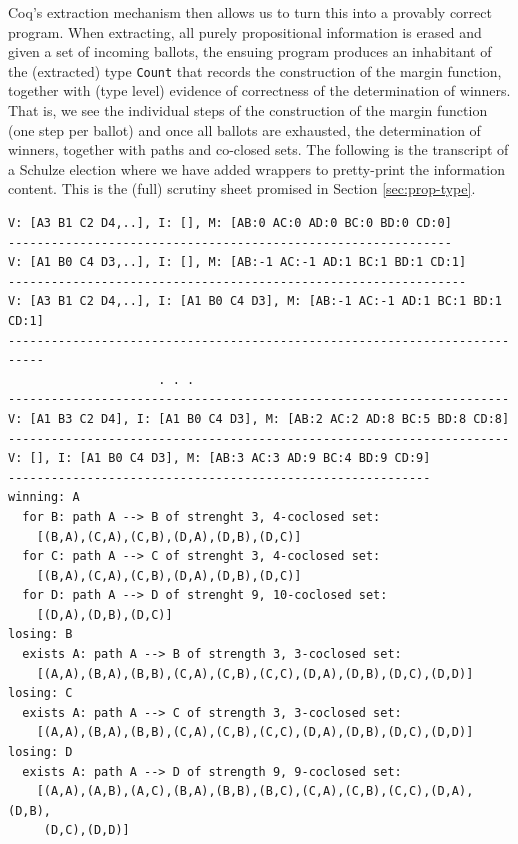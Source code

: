 Coq's extraction mechanism then allows us to turn this into a
provably correct program. When extracting, all purely propositional
information is erased and given a set of incoming ballots, the ensuing program produces an inhabitant
of the (extracted) type \texttt{Count} that records the construction
of the margin function, together with (type level) evidence of
correctness of the determination of winners. That is, we see the
individual steps of the construction of the margin function (one
step per
ballot) and once all ballots are exhausted, the determination of
winners, together with paths and co-closed sets. The following is
the transcript of a Schulze election where we have added wrappers
to pretty-print the information content. This is the (full) scrutiny
sheet promised in Section \ref{sec:prop-type}.
%
\begin{footnotesize}
\begin{verbatim}
V: [A3 B1 C2 D4,..], I: [], M: [AB:0 AC:0 AD:0 BC:0 BD:0 CD:0]
--------------------------------------------------------------
V: [A1 B0 C4 D3,..], I: [], M: [AB:-1 AC:-1 AD:1 BC:1 BD:1 CD:1]
----------------------------------------------------------------
V: [A3 B1 C2 D4,..], I: [A1 B0 C4 D3], M: [AB:-1 AC:-1 AD:1 BC:1 BD:1 CD:1]
---------------------------------------------------------------------------
                     . . .
----------------------------------------------------------------------
V: [A1 B3 C2 D4], I: [A1 B0 C4 D3], M: [AB:2 AC:2 AD:8 BC:5 BD:8 CD:8]
----------------------------------------------------------------------
V: [], I: [A1 B0 C4 D3], M: [AB:3 AC:3 AD:9 BC:4 BD:9 CD:9]
-----------------------------------------------------------
winning: A
  for B: path A --> B of strenght 3, 4-coclosed set: 
    [(B,A),(C,A),(C,B),(D,A),(D,B),(D,C)]
  for C: path A --> C of strenght 3, 4-coclosed set:
    [(B,A),(C,A),(C,B),(D,A),(D,B),(D,C)]
  for D: path A --> D of strenght 9, 10-coclosed set:
    [(D,A),(D,B),(D,C)]
losing: B
  exists A: path A --> B of strength 3, 3-coclosed set:
    [(A,A),(B,A),(B,B),(C,A),(C,B),(C,C),(D,A),(D,B),(D,C),(D,D)]
losing: C
  exists A: path A --> C of strength 3, 3-coclosed set:
    [(A,A),(B,A),(B,B),(C,A),(C,B),(C,C),(D,A),(D,B),(D,C),(D,D)]
losing: D
  exists A: path A --> D of strength 9, 9-coclosed set:
    [(A,A),(A,B),(A,C),(B,A),(B,B),(B,C),(C,A),(C,B),(C,C),(D,A),(D,B),
     (D,C),(D,D)]  
\end{verbatim}
\end{footnotesize}


